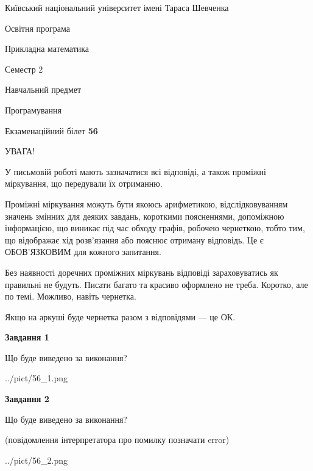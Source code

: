 \documentclass[12pt, ukrainian]{article}
\begin{document}
{{\begin {small}\par
{ \center  Київський національний університет імені Тараса Шевченка \par}
{\parbox {5 cm}{Освітня програма \hfill}{\parbox {7 cm}{Прикладна математика\hfill}}\parbox {6 cm}{\hfill Семестр 2}}\par
{\parbox {5 cm} {Навчальний предмет \hfill}\parbox {7 cm}{Програмування \hfill}\parbox {6cm}{\hfill}\par}\vspace{-7pt} \end{small}}{\center Екзаменаційний білет \No \textbf
{ 56 }\par}}
{
\begin {large}
УВАГА!

У письмовій роботі мають зазначатися всі відповіді, а також проміжні міркування, що передували їх отриманню.

Проміжні міркування можуть бути якоюсь арифметикою, відслідковуванням зна\-чень змінних для деяких завдань,
короткими поясненнями, допоміжною інформацією, що виникає під час обходу графів, робочею чернеткою,
тобто тим, що відображає хід розв’язання або пояснює отриману відповідь.
Це є ОБОВ’ЯЗКОВИМ для кожного запитання.

Без наявності доречних проміжних міркувань відповіді зараховуватись як правиль\-ні не будуть.
Писати багато та красиво оформлено не треба. Коротко, але по темі. Можли\-во, навіть чернетка.

Якщо на аркуші буде чернетка разом з відповідями --- це ОК.

\newpage

{\begin {center}\textbf{Завдання 1}\end {center}}\par
Що буде виведено за виконання?\par
\begin{center}
	{../pict/56_1.png}
\end{center}
\newpage

{\begin {center}\textbf{Завдання 2}\end {center}}\par
Що буде виведено за виконання?\par
 (повідомлення інтерпретатора про помилку позначати error)\par
\begin{center}
	{../pict/56_2.png}
\end{center}
\newpage


\end{large}}
\end{document}
